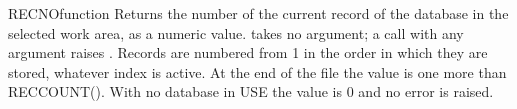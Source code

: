 \begin{XbaseEntry}{RECNO}{function}
Returns the number of the current record of the database in the selected work area, as a numeric value.
\Syntax
{}
\Usage
{} takes no argument; a call with any argument raises . Records are numbered from 1 in the order in which they are stored, whatever index is active. At the end of the file the value is one more than RECCOUNT(). With no database in USE the value is 0 and no error is raised.
\Examples
{}
\end{XbaseEntry}

